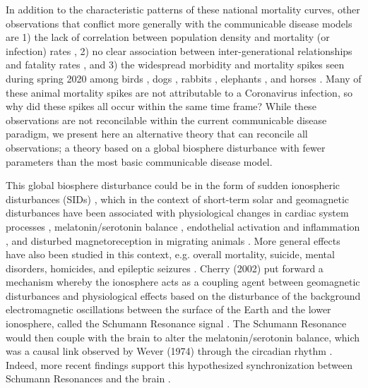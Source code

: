\documentclass{article}
\begin{document}
In addition to the characteristic patterns of these national mortality curves, other observations that conflict more generally with the communicable disease models are 1) the lack of correlation between population density and mortality (or infection) rates \cite{Hamidi2020,Hamidi2020a,Carozzi2020,liu2020emerging,medica2020covid,khavarian2021high,barak2021urban}, 2) no clear association between inter-generational relationships and fatality rates \cite{Arpino2020}, and 3) the widespread morbidity and mortality spikes seen during spring 2020 among birds \cite{Fischer2021}, dogs \cite{PeriseBarrios2021}, rabbits \cite{Duff2020,Hu2020,Fukui2021}, elephants \cite{Aarde2021}, and horses \cite{Kambayashi2021,King2020,Lu2020,CastilloOlivares2020}. Many of these animal mortality spikes are not attributable to a Coronavirus infection, so why did these spikes all occur within the same time frame? While these observations are not reconcilable within the current communicable disease paradigm, we present here an alternative theory that can reconcile all observations; a theory based on a global biosphere disturbance with fewer parameters than the most basic communicable disease model. 

This global biosphere disturbance could be in the form of sudden ionospheric disturbances (SIDs) \cite{cannon1982schumann}, which in the context of short-term solar and geomagnetic disturbances have been associated with physiological changes in cardiac system processes \cite{vieira2022geomagnetic,Alabdulgader2018,ghione1998geomagnetic,chernouss2001geophysical,stoupel1995ambulatory,stoupel2011twenty,malin1979correlation,stoupel1993sudden}, melatonin/serotonin balance \cite{burch1999geomagnetic,rapoport1997effects,bergiannaki1996seasonal}, endothelial activation and inflammation \cite{schiff2022role}, and disturbed magnetoreception in migrating animals \cite{keeton1974normal,schreiber1976correlation,kowalski1988normal,bianco2019magnetic,ferrari2017cetacean,vanselow2018solar,granger2020gray}. More general effects have also been studied in this context, e.g. overall mortality, suicide, mental disorders, homicides, and epileptic seizures \cite{zenchenko2021possible,zilli2019geomagnetic,gordon2003effect,kay1994geomagnetic,kay2004schizophrenia,halberg2005chronomics,berk2006ambient,doronin1998effect,persinger1995sudden}. Cherry (2002) put forward a mechanism whereby the ionosphere acts as a coupling agent between geomagnetic disturbances and physiological effects based on the disturbance of the background electromagnetic oscillations between the surface of the Earth and the lower ionosphere, called the Schumann Resonance signal \cite{cherry2002schumann,schumann1952strahlungslosen}. The Schumann Resonance would then couple with the brain to alter the melatonin/serotonin balance, which was a causal link observed by Wever (1974) through the circadian rhythm \cite{wever1974elf}. Indeed, more recent findings support this hypothesized synchronization between Schumann Resonances and the brain \cite{pobachenko2006contingency,saroka2014quantitative,persinger2015human,konig2012biologic}.
\end{document}
